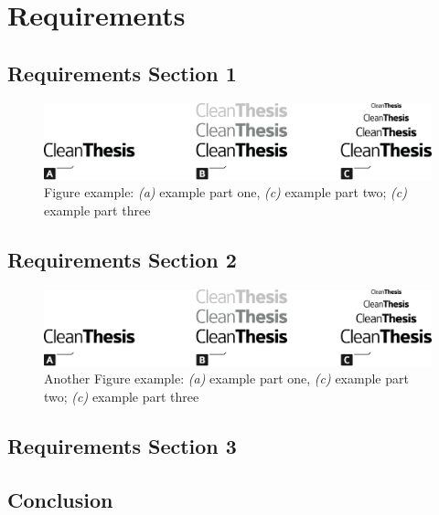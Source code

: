 %
\chapter{Requirements}
\label{sec:requirements}


\Blindtext[2][1]

\section{Requirements Section 1}
\label{sec:requirements:sec1}

\Blindtext[1][2]

\begin{figure}[htb]
	\includegraphics[width=\textwidth]{gfx/Clean-Thesis-Figure}
	\caption{Figure example: \textit{(a)} example part one, \textit{(c)} example part two; \textit{(c)} example part three}
	\label{fig:requirements:example1}
\end{figure}

\Blindtext[1][2]

\section{Requirements Section 2}
\label{sec:requirements:sec2}

\Blindtext[1][2]

\begin{figure}[htb]
	\includegraphics[width=\textwidth]{gfx/Clean-Thesis-Figure}
	\caption{Another Figure example: \textit{(a)} example part one, \textit{(c)} example part two; \textit{(c)} example part three}
	\label{fig:requirements:example2}
\end{figure}

\Blindtext[2][2]

\section{Requirements Section 3}
\label{sec:requirements:sec3}

\Blindtext[4][2]

\section{Conclusion}
\label{sec:requirements:conclusion}

\Blindtext[2][1]
